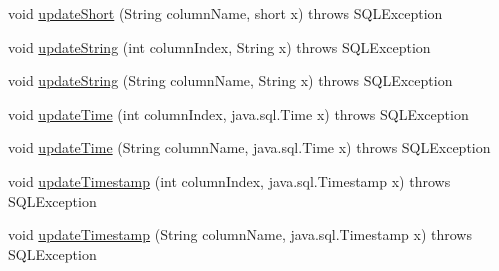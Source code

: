 \begin{DoxyCompactItemize}
\item 
void \mbox{\hyperlink{classcom_1_1mysql_1_1jdbc_1_1_updatable_result_set_a6bbe60d1c6cc1b5d6b413b47eedfddf6}{update\+Short}} (String column\+Name, short x)  throws S\+Q\+L\+Exception 
\item 
void \mbox{\hyperlink{classcom_1_1mysql_1_1jdbc_1_1_updatable_result_set_a2700e7ffdff6222d85545e1cb7019e95}{update\+String}} (int column\+Index, String x)  throws S\+Q\+L\+Exception 
\item 
void \mbox{\hyperlink{classcom_1_1mysql_1_1jdbc_1_1_updatable_result_set_a2d2c5c76d6479a6c82e680ea1bde42bc}{update\+String}} (String column\+Name, String x)  throws S\+Q\+L\+Exception 
\item 
void \mbox{\hyperlink{classcom_1_1mysql_1_1jdbc_1_1_updatable_result_set_a72c299ac228ddd995fe6f1499d5da439}{update\+Time}} (int column\+Index, java.\+sql.\+Time x)  throws S\+Q\+L\+Exception 
\item 
void \mbox{\hyperlink{classcom_1_1mysql_1_1jdbc_1_1_updatable_result_set_a92f4018fe4868d05817bfe39a711fe79}{update\+Time}} (String column\+Name, java.\+sql.\+Time x)  throws S\+Q\+L\+Exception 
\item 
void \mbox{\hyperlink{classcom_1_1mysql_1_1jdbc_1_1_updatable_result_set_ac64644e427b3351770c30753ad0d9bbd}{update\+Timestamp}} (int column\+Index, java.\+sql.\+Timestamp x)  throws S\+Q\+L\+Exception 
\item 
void \mbox{\hyperlink{classcom_1_1mysql_1_1jdbc_1_1_updatable_result_set_a76ddad6df768c73381a9cdb2797aeba4}{update\+Timestamp}} (String column\+Name, java.\+sql.\+Timestamp x)  throws S\+Q\+L\+Exception 
\end{DoxyCompactItemize}
